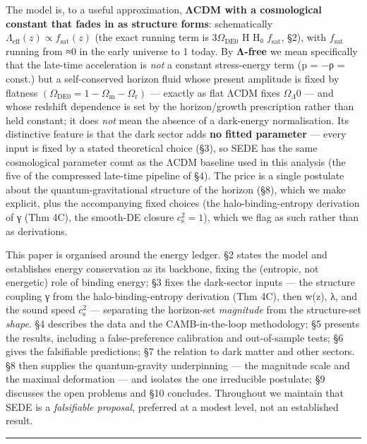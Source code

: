 \documentclass[
  10pt,
]{article}
\begin{document}
The model is, to a useful approximation, \textbf{ΛCDM with a
cosmological constant that fades in as structure forms}: schematically
\(\Lambda _{\mathrm{eff}}(z) \propto  f_{\mathrm{sat}}(z)\) (the exact
running term is \(3\Omega _{\mathrm{DE0}}\) H H₀ \(f_{\mathrm{sat}}\),
§2), with \(f_{\mathrm{sat}}\) running from ≈0 in the early universe to
1 today. By \textbf{Λ-free} we mean specifically that the late-time
acceleration is \emph{not} a constant stress-energy term (p = −ρ =
const.) but a self-conserved horizon fluid whose present amplitude is
fixed by flatness
\((\Omega _{\mathrm{DE0}} = 1 - \Omega _{\mathrm{m}} - \Omega _{\mathrm{r}})\)
--- exactly as flat ΛCDM fixes \(\Omega _\Lambda 0\) --- and whose
redshift dependence is set by the horizon/growth prescription rather
than held constant; it does \emph{not} mean the absence of a dark-energy
normalisation. Its distinctive feature is that the dark sector adds
\textbf{no fitted parameter} --- every input is fixed by a stated
theoretical choice (§3), so SEDE has the same cosmological parameter
count as the ΛCDM baseline used in this analysis (the five of the
compressed late-time pipeline of §4). The price is a single postulate
about the quantum-gravitational structure of the horizon (§8), which we
make explicit, plus the accompanying fixed choices (the
halo-binding-entropy derivation of γ (Thm 4C), the smooth-DE closure
\(c_{\mathrm{s}}^{2}=1\)), which we flag as such rather than as
derivations.

This paper is organised around the energy ledger. §2 states the model
and establishes energy conservation as its backbone, fixing the
(entropic, not energetic) role of binding energy; §3 fixes the
dark-sector inputs --- the structure coupling γ from the
halo-binding-entropy derivation (Thm 4C), then w(z), λ, and the sound
speed \(c_{\mathrm{s}}^{2}\) --- separating the horizon-set
\emph{magnitude} from the structure-set \emph{shape}. §4 describes the
data and the CAMB-in-the-loop methodology; §5 presents the results,
including a false-preference calibration and out-of-sample tests; §6
gives the falsifiable predictions; §7 the relation to dark matter and
other sectors. §8 then supplies the quantum-gravity underpinning --- the
magnitude scale and the maximal deformation --- and isolates the one
irreducible postulate; §9 discusses the open problems and §10 concludes.
Throughout we maintain that SEDE is a \emph{falsifiable proposal},
preferred at a modest level, not an established result.

\begin{center}\rule{0.5\linewidth}{0.5pt}\end{center}
\end{document}
